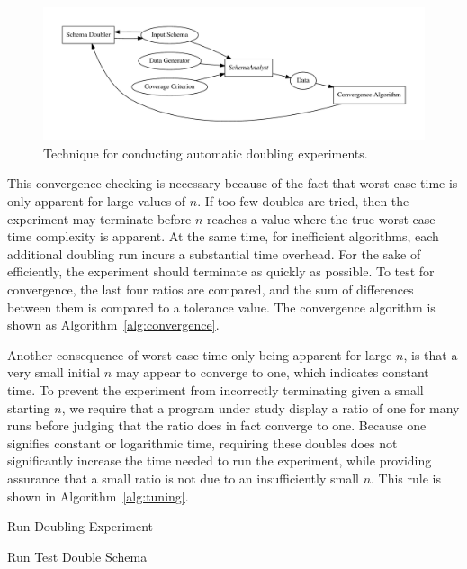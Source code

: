   \begin{figure}
    \centering
    \centering
    \includegraphics[width=.5\linewidth]{../diagrams/doublingexp.pdf}
    \caption{Technique for conducting automatic doubling experiments.}
    \label{fig:doublingexp}
  \end{figure}


  This convergence checking is necessary because of the fact that worst-case
  time is only apparent for large values of $n$. If too few doubles
  are tried, then the experiment may terminate before $n$ reaches a value
  where the true worst-case time complexity is apparent. At the same time,
  for inefficient  algorithms, each additional doubling run incurs a substantial
  time overhead. For the sake of efficiently, the experiment should
  terminate as quickly as possible.
  To test for convergence, the last four ratios are compared, and the
  sum of differences between them is compared to a tolerance value. The
  convergence algorithm is shown as Algorithm~\ref{alg:convergence}.

  Another consequence of worst-case time only being apparent for large
  $n$, is that a very small initial $n$ may appear to converge to one,
  which indicates constant time. To prevent the
  experiment from incorrectly terminating given a small starting $n$, we
  require that a program under study display a ratio of one for many
  runs before judging that the ratio does in fact converge to one. Because 
  one signifies constant or logarithmic 
  time, requiring these doubles does not significantly increase the time needed
  to run the experiment, while providing assurance that a small ratio is not due
  to an insufficiently small $n$. This rule is shown in 
  Algorithm~\ref{alg:tuning}.

  \begin{algorithm}[t]
    \caption{Run Doubling Experiment}
    \begin{algorithmic}
      \STATE Run Test
      \ENDFOR
      \STATE Double Schema
      \ENDWHILE
    \end{algorithmic}
    \label{alg:main}
  \end{algorithm}

